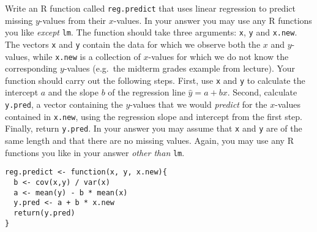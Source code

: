 \documentclass[addpoints,12pt]{exam}
\begin{document}
\begin{questions}

\question[30] Write an R function called \texttt{reg.predict} that uses linear regression to predict missing $y$-values from their $x$-values. In your answer you may use any R functions you like \emph{except} \texttt{lm}. The function should take three arguments: \texttt{x}, \texttt{y} and \texttt{x.new}. The vectors \texttt{x} and \texttt{y} contain the data for which we observe both the $x$ and $y$-values, while \texttt{x.new} is a collection of $x$-values for which we do not know the corresponding $y$-values (e.g.\ the midterm grades example from lecture). Your function should carry out the following steps. First, use \texttt{x} and \texttt{y} to calculate the intercept $a$ and the slope $b$ of the regression line $\widehat{y} = a + bx$. Second, calculate \texttt{y.pred}, a vector containing the $y$-values that we would \emph{predict} for the $x$-values contained in \texttt{x.new}, using the regression slope and intercept from the first step. Finally, return \texttt{y.pred}. In your answer you may assume that \texttt{x} and \texttt{y} are of the same length and that there are no missing values. Again, you may use any R functions you like in your answer \emph{other than} \texttt{lm}.
\begin{solution}
	\begin{verbatim}
reg.predict <- function(x, y, x.new){
  b <- cov(x,y) / var(x)
  a <- mean(y) - b * mean(x)
  y.pred <- a + b * x.new
  return(y.pred)
}
	\end{verbatim}
\end{solution}
	


\end{questions}
\end{document}
